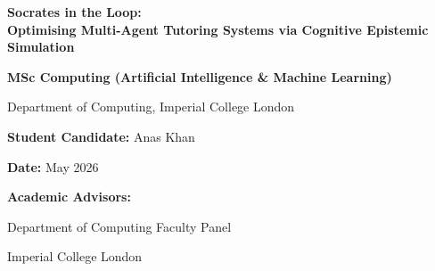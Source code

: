 \documentclass[11pt,a4paper]{report}
\begin{document}
\begin{titlepage}
    \centering
    \vspace*{2cm}
    {\Huge \bfseries Socrates in the Loop: \\ Optimising Multi-Agent Tutoring Systems via Cognitive Epistemic Simulation \par}
    \vspace{1.5cm}
    {\Large \bfseries MSc Computing (Artificial Intelligence \& Machine Learning) \par}
    \vspace{0.5cm}
    {\large Department of Computing, Imperial College London \par}
    \vspace{2cm}
    {\large \textbf{Student Candidate:} Anas Khan \par}
    {\large \textbf{Date:} May 2026 \par}
    \vspace{2cm}
    {\large \textbf{Academic Advisors:} \par}
    {\large Department of Computing Faculty Panel \par}
    \vfill
    {\large Imperial College London \par}
\end{titlepage}


\begin{abstract}
Large Language Models (LLMs) have become powerful tools for information retrieval, yet their default optimisation towards direct answer generation bypasses the cognitive struggle essential for durable human learning. This dissertation presents the design and implementation of a Socratic Multi-Agent System (MAS) for computer science education, built to guide students towards conceptual mastery through adaptive Socratic questioning. Evaluating such systems with live human cohorts carries substantial financial, ethical, and operational costs at the prototype stage. To support early-stage design without over-claiming human efficacy, we propose an Agent-in-the-Loop Epistemic Simulation: a controlled simulation environment for stress-testing tutor policies against cognitively constrained student agents before any human deployment. We address three structural limitations in current educational agent simulation: (1) Cognitive Bandwidth and Friction Modelling (CBFM), which operationalises prompt complexity, working-memory pressure, and Zone of Proximal Development mismatch as explicit simulator variables; (2) Sycophancy Mitigation via Adversarial Scratchpad Probing, which reduces dialogue-level agreement bias by separating public student utterances from independent diagnostic code execution; and (3) POMDP Tutor Policy Evaluation, which compares offline Q-learning over interpretable Socratic directives against strong heuristic and contextual-bandit alternatives. A cyclic multi-agent graph in LangGraph orchestrates the Socratic tutor, epistemic tracker, and pedagogical guardrail, with simulated learning gains triangulated through held-out diagnostic probes, leakage measurements, ablation studies, and expert transcript ratings.
\end{abstract}
\end{document}
